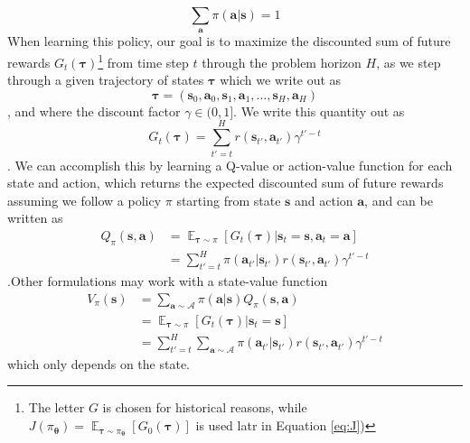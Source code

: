 \documentclass{article}
\begin{document}
\begin{equation}\label{eq:normalization}
\sum_\mathbf{a}\pi(\mathbf{a}|\mathbf{s})=1
\end{equation}When learning this policy, our goal is to maximize the discounted sum of future rewards $G_t(\boldsymbol{\tau})$\footnote{The letter $G$ is chosen for historical reasons, while $J(\pi_{\boldsymbol{\theta}})=\mathop{\mathbb{E}}_{\boldsymbol{\tau}\sim\pi_{\boldsymbol{\theta}}}[G_0({\boldsymbol{\tau}})]$ is used latr in Equation \ref{eq:J})} from time step $t$ through the problem horizon $H$, as we step through a given trajectory of states $\boldsymbol{\tau}$ which we write out as
\begin{equation}
\boldsymbol{\tau}=(\mathbf{s}_0,\mathbf{a}_0,\mathbf{s}_1,\mathbf{a}_1,\dots,\mathbf{s}_H,\mathbf{a}_H)
\end{equation}, and where the discount factor $\gamma\in(0,1]$. We write this quantity out as
\begin{equation}
    G_t(\boldsymbol{\tau})=\sum_{t'=t}^{H}r(\mathbf{s}_{t'},\mathbf{a}_{t'})\gamma^{t'-t}
\end{equation}.
We can accomplish this by learning a Q-value or action-value function for each state and action, which returns the expected discounted sum of future rewards assuming we follow a policy $\pi$ starting from state $\mathbf{s}$ and action $\mathbf{a}$, and can be written as
\begin{equation}
\begin{split}
Q_\pi(\mathbf{s},\mathbf{a})&=\mathop{\mathbb{E}}_{\boldsymbol{\tau}\sim\pi}[G_t({\boldsymbol{\tau}})|\mathbf{s}_t=\mathbf{s},\mathbf{a}_t=\mathbf{a}]\\&=\sum_{t'=t}^{H}\pi(\mathbf{a}_{t'}|\mathbf{s}_{t'})r(\mathbf{s}_{t'},\mathbf{a}_{t'})\gamma^{t'-t}
\end{split}
\end{equation}.Other formulations may work with a state-value function \begin{equation}\begin{split}V_{\pi}(\mathbf{s})&=\sum_{\mathbf{a}\sim\mathcal{A}}\pi(\mathbf{a}|\mathbf{s})Q_\pi(\mathbf{s},\mathbf{a})\\&=\mathop{\mathbb{E}}_{\boldsymbol{\tau}\sim\pi}[G_t({\boldsymbol{\tau}})|\mathbf{s}_t=\mathbf{s}]\\&=\sum_{t'=t}^{H}\sum_{\mathbf{a}\sim\mathcal{A}}\pi(\mathbf{a}_{t'}|\mathbf{s}_{t'})r(\mathbf{s}_{t'},\mathbf{a}_{t'})\gamma^{t'-t}\end{split}\end{equation}which only depends on the state.
\end{document}
